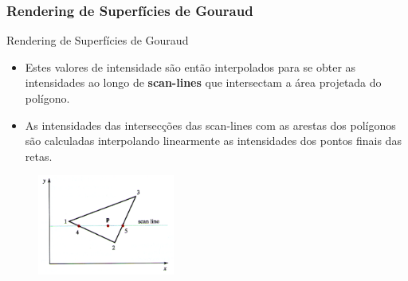 \documentclass{beamer}
\begin{document}
\begin{frame}
\frametitle{Rendering de Superfícies de Gouraud}

		\begin{block}{Rendering de Superfícies de Gouraud}
		\begin{itemize}
			\item Estes valores de intensidade são então interpolados para se obter as intensidades ao longo de \textbf{scan-lines} que intersectam a área projetada do polígono.
			\item As intensidades das intersecções das scan-lines com as arestas dos polígonos são calculadas interpolando linearmente as intensidades dos pontos finais das retas. 
		\end{itemize}
	\end{block}
	
	\begin{figure}[!h]
			\begin{center}
			\includegraphics[width=0.4\textwidth]{Figures/Int1}
			\end{center}
		\end{figure}
	
\end{frame}
\end{document}

